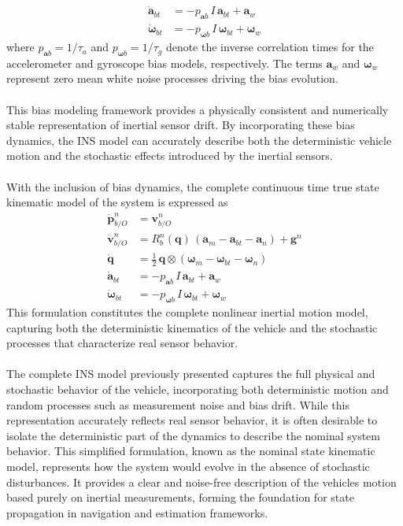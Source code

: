 $$
\begin{aligned}
    \dot{\mathbf{a}}_{bt} &= -p_{\mathbf{a}b}\,I\,\mathbf{a}_{bt} + \mathbf{a}_{w} \\
    \dot{\mathbf{\omega}}_{bt} &= -p_{\mathbf{\omega}b}\,I\,\mathbf{\omega}_{bt} + \mathbf{\omega}_{w}
\end{aligned}
$$
where $p_{\mathbf{a}b} = 1/\tau_a$ and $p_{\mathbf{\omega}b} = 1/\tau_g$ denote the inverse correlation times for the accelerometer and gyroscope bias models, respectively. The terms $\mathbf{a}_{w}$ and $\mathbf{\omega}_{w}$ represent zero mean white noise processes driving the bias evolution.  
\\ \\
This bias modeling framework provides a physically consistent and numerically stable representation of inertial sensor drift. By incorporating these bias dynamics, the INS model can accurately describe both the deterministic vehicle motion and the stochastic effects introduced by the inertial sensors.  
\\ \\
With the inclusion of bias dynamics, the complete continuous time true state kinematic model of the system is expressed as
$$
\begin{aligned}
    \dot{\mathbf{p}}_{b/O}^{n} &= \mathbf{v}_{b/O}^{n} \\
    \dot{\mathbf{v}}_{b/O}^{n} &= R_b^n(\mathbf{q})\,(\mathbf{a}_m - \mathbf{a}_{bt} - \mathbf{a}_n) + \mathbf{g}^n \\
    \dot{\mathbf{q}} &= \tfrac{1}{2}\,\mathbf{q} \otimes (\boldsymbol{\omega}_m - \mathbf{\omega}_{bt} - \mathbf{\omega}_n) \\
    \dot{\mathbf{a}}_{bt} &= -p_{\mathbf{a}b}\,I\,\mathbf{a}_{bt} + \mathbf{a}_{w} \\
    \dot{\mathbf{\omega}}_{bt} &= -p_{\mathbf{\omega}b}\,I\,\mathbf{\omega}_{bt} + \mathbf{\omega}_{w}
\end{aligned}
$$
This formulation constitutes the complete nonlinear inertial motion model, capturing both the deterministic kinematics of the vehicle and the stochastic processes that characterize real sensor behavior.
\\ \\
The complete INS model previously presented captures the full physical and stochastic behavior of the vehicle, incorporating both deterministic motion and random processes such as measurement noise and bias drift. While this representation accurately reflects real sensor behavior, it is often desirable to isolate the deterministic part of the dynamics to describe the nominal system behavior. This simplified formulation, known as the nominal state kinematic model, represents how the system would evolve in the absence of stochastic disturbances. It provides a clear and noise-free description of the vehicles motion based purely on inertial measurements, forming the foundation for state propagation in navigation and estimation frameworks.  
